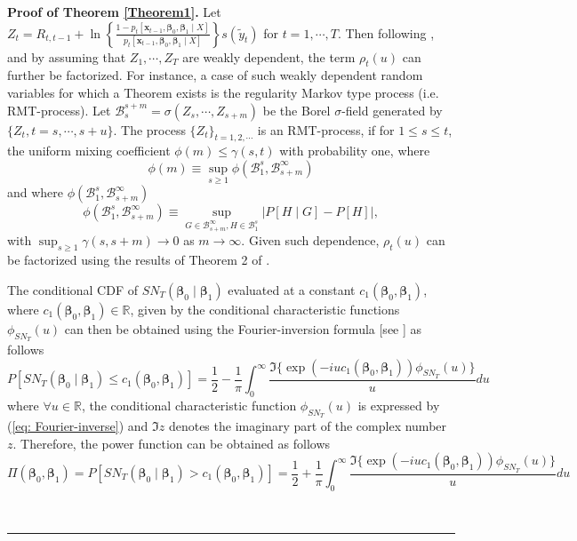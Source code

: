 \documentclass[harvard,11pt]{article}
\newenvironment{proof}[1][Proof]{\textbf{#1.} }{\  \rule{0.5em}{0.5em}}
\begin{document}
\begin{proof}[Proof of Theorem \protect\ref{Theorem1}]
Let $Z_t=R_{t,t-1}+\ln\left\{\frac{1-p_t[\bm{x}_{t-1},\bm{\beta}_0,\bm{\beta}_1\mid X]}{p_t[\bm{x}_{t-1},\bm{\beta}_0,\bm{\beta}_1\mid X]}\right\}s(\tilde{y}_t)$ for $t=1,\cdots,T$. Then following \citet{heinrich1982factorization}, and by assuming that $Z_1,\cdots,Z_T$ are weakly dependent, the term $\rho_t(u)$ can further be factorized. For instance, a case of such weakly dependent random variables for which a Theorem exists is the regularity Markov type process (i.e. RMT-process). Let $\mathcal{B}_s^{s+m}=\sigma(Z_s,\cdots,Z_{s+m})$ be the Borel $\sigma$-field generated by $\{Z_t, t=s,\cdots,s+u\}$. The process $\{Z_t\}_{t=1,2,\cdots}$ is an RMT-process, if for $1\leq s\leq t$, the uniform mixing coefficient $\phi(m)\leq\gamma(s,t)$ with probability one, where 
\begin{equation*}
\phi(m)\equiv\sup_{s\geq 1}\phi(\mathcal{B}_{1}^s,\mathcal{B}_{s+m}^\infty)
\end{equation*}
and where $\phi(\mathcal{B}_{1}^s,\mathcal{B}_{s+m}^\infty)$
\begin{equation*}
\phi(\mathcal{B}_{1}^s,\mathcal{B}_{s+m}^\infty)\equiv \sup_{G\in\mathcal{B}_{s+m}^{\infty},H\in \mathcal{B}_{1}^s}\lvert P[H\mid G]-P[H]\lvert,
\end{equation*}
with $\sup_{s\geq1}\gamma(s,s+m)\rightarrow0$ as $m\rightarrow \infty$. Given such dependence, $\rho_t(u)$ can be factorized using the results of Theorem 2 of \citet{heinrich1982factorization}.

The conditional CDF of $SN_T(\bm{\beta}_0\mid\bm{\beta}_1)$ evaluated at a constant $c_1(\bm{\beta}_0,\bm{\beta}_1)$, where $c_1(\bm{\beta}_0,\bm{\beta}_1)\in\mathbb{R}$, given by the conditional characteristic functions $\phi_{SN_T}(u)$ can then be obtained using the Fourier-inversion formula [see \citet{gil1951note}] as follows
\[
P[SN_T(\bm{\beta}_0\mid \bm{\beta}_1)\leq c_1(\bm{\beta}_0,\bm{\beta}_1)]=\frac{1}{2}-\frac{1}{\pi}\int_{0}^{\infty}\frac{\Im\{\exp(-iuc_1(\bm{\beta}_0,\bm{\beta}_1))\phi_{SN_T}(u)\}}{u}du
\] 
where $\forall u \in \mathbb{R}$, the conditional characteristic function $\phi_{SN_T}(u)$ is expressed by (\ref{eq: Fourier-inverse}) and $\Im{z}$ denotes the imaginary part of the complex number $z$. Therefore, the power function can be obtained as follows
\[
\Pi(\bm{\beta}_0,\bm{\beta}_1)=P[SN_T(\bm{\beta}_0\mid \bm{\beta}_1)> c_1(\bm{\beta}_0,\bm{\beta}_1)]=\frac{1}{2}+\frac{1}{\pi}\int_{0}^{\infty}\frac{\Im\{\exp(-iuc_1(\bm{\beta}_0,\bm{\beta}_1))\phi_{SN_T}(u)\}}{u}du
\] 

\end{proof}
\end{document}

